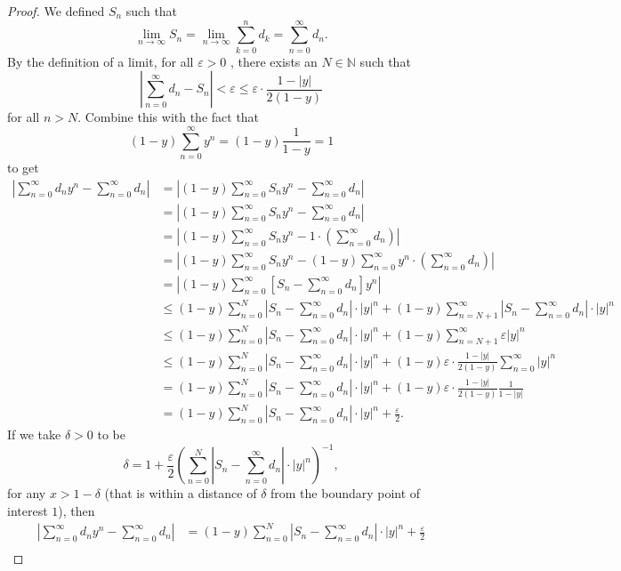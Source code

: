 \documentclass{article}
\newcommand{\N}{\mathbb{N}}
\theoremstyle{definition}
\begin{document}
\begin{proof}
		We defined $S_n$ such that $$ \lim\limits_{n\to\infty}S_n= \lim\limits_{n\to\infty} \sum_{k=0}^{n}d_k = \sum_{n=0}^\infty d_n.$$ By the definition of a limit, for all $ \varepsilon >0$ , there exists an $ N\in\N $ such that $$\left\lvert\sum_{n=0}^\infty d_n-S_n\right\rvert<\varepsilon \le  \varepsilon\cdot\frac{1-|y|}{2(1-y)}$$ for all $ n>N $. Combine this with the fact that  $$(1-y)\sum_{n=0}^\infty y^n = (1-y)\frac{1}{1-y} = 1$$ to get 
		\begin{align*}
			\left\lvert\sum_{n=0}^{\infty}d_ny^n -  \sum_{n=0}^{\infty}d_n\right\rvert & = \left\lvert(1-y)\sum_{n=0}^{\infty}S_ny^n - \sum_{n=0}^{\infty}d_n\right\rvert\\
			&= \left\lvert(1-y)\sum_{n=0}^{\infty}S_ny^n - \sum_{n=0}^{\infty}d_n\right\rvert\\
			&= \left\lvert(1-y)\sum_{n=0}^{\infty}S_ny^n - 1\cdot\left(\sum_{n=0}^{\infty}d_n\right)\right\rvert\\
			&= \left\lvert(1-y)\sum_{n=0}^{\infty}S_ny^n - (1-y)\sum_{n=0}^{\infty}y^n\cdot\left(\sum_{n=0}^{\infty}d_n\right)\right\rvert\\
			&= \left\lvert(1-y)\sum_{n=0}^{\infty}\left[S_n-\sum_{n=0}^{\infty}d_n\right]y^n \right\rvert\\
			& \le (1-y)\sum_{n=0}^{N}\left\lvert S_n-\sum_{n=0}^{\infty}d_n \right\rvert\cdot|y|^n + (1-y)\sum_{n=N+1}^{\infty}\left\lvert S_n-\sum_{n=0}^{\infty}d_n \right\rvert\cdot|y|^n \\ 
			& \le (1-y)\sum_{n=0}^{N}\left\lvert S_n-\sum_{n=0}^{\infty}d_n \right\rvert\cdot|y|^n + (1-y)\sum_{n=N+1}^{\infty}\varepsilon|y|^n \\ & \le (1-y)\sum_{n=0}^{N}\left\lvert S_n-\sum_{n=0}^{\infty}d_n \right\rvert\cdot|y|^n + (1-y)\varepsilon\cdot\frac{1-|y|}{2(1-y)}\sum_{n=0}^{\infty}|y|^n \\ & = (1-y)\sum_{n=0}^{N}\left\lvert S_n-\sum_{n=0}^{\infty}d_n \right\rvert\cdot|y|^n + (1-y)\varepsilon\cdot\frac{1-|y|}{2(1-y)} \frac{1}{1-|y|} \\ & = (1-y)\sum_{n=0}^{N}\left\lvert S_n-\sum_{n=0}^{\infty}d_n \right\rvert\cdot|y|^n + \frac{\varepsilon}{2}.
		\end{align*}
		If we take $ \delta  > 0 $ to be $$ \delta = 1 + \frac{\varepsilon}{2}\left(\sum_{n=0}^{N}\left\lvert S_n-\sum_{n=0}^{\infty}d_n \right\rvert\cdot|y|^n\right)^{-1},$$ for any $ x > 1 - \delta $ (that is within a distance of $ \delta $ from the boundary point of interest $ 1 $), then 
		\begin{align*}
			\left\lvert\sum_{n=0}^{\infty}d_ny^n -  \sum_{n=0}^{\infty}d_n\right\rvert & = (1-y)\sum_{n=0}^{N}\left\lvert S_n-\sum_{n=0}^{\infty}d_n \right\rvert\cdot|y|^n + \frac{\varepsilon}{2} \\

\end{align*}
\end{proof}
\end{document}
